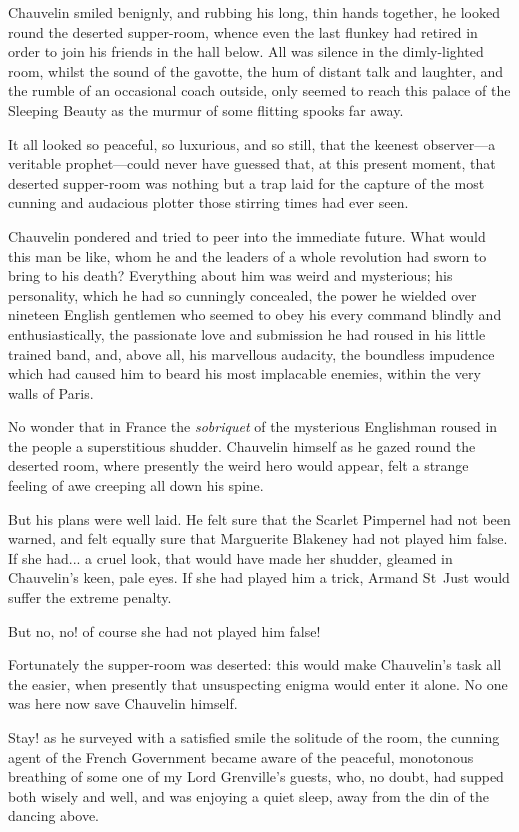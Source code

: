 Chauvelin smiled benignly, and rubbing his long, thin hands together, he looked round the deserted supper-room, whence even the last flunkey had retired in order to join his friends in the hall below. All was silence in the dimly-lighted room, whilst the sound of the gavotte, the hum of distant talk and laughter, and the rumble of an occasional coach outside, only seemed to reach this palace of the Sleeping Beauty as the murmur of some flitting spooks far away.

It all looked so peaceful, so luxurious, and so still, that the keenest observer---a veritable prophet---could never have guessed that, at this present moment, that deserted supper-room was nothing but a trap laid for the capture of the most cunning and audacious plotter those stirring times had ever seen.

Chauvelin pondered and tried to peer into the immediate future. What would this man be like, whom he and the leaders of a whole revolution had sworn to bring to his death? Everything about him was weird and mysterious; his personality, which he had so cunningly concealed, the power he wielded over nineteen English gentlemen who seemed to obey his every command blindly and enthusiastically, the passionate love and submission he had roused in his little trained band, and, above all, his marvellous audacity, the boundless impudence which had caused him to beard his most implacable enemies, within the very walls of Paris.

No wonder that in France the \textit{sobriquet} of the mysterious Englishman roused in the people a superstitious shudder. Chauvelin himself as he gazed round the deserted room, where presently the weird hero would appear, felt a strange feeling of awe creeping all down his spine.

But his plans were well laid. He felt sure that the Scarlet Pimpernel had not been warned, and felt equally sure that Marguerite Blakeney had not played him false. If she had... a cruel look, that would have made her shudder, gleamed in Chauvelin's keen, pale eyes. If she had played him a trick, Armand St~Just would suffer the extreme penalty.

But no, no! of course she had not played him false!

Fortunately the supper-room was deserted: this would make Chauvelin's task all the easier, when presently that unsuspecting enigma would enter it alone. No one was here now save Chauvelin himself.

Stay! as he surveyed with a satisfied smile the solitude of the room, the cunning agent of the French Government became aware of the peaceful, monotonous breathing of some one of my Lord Grenville's guests, who, no doubt, had supped both wisely and well, and was enjoying a quiet sleep, away from the din of the dancing above.

